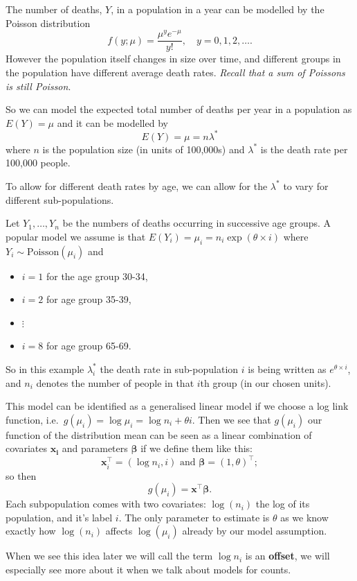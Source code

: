 \documentclass[
  a4paper,
  DIV=11,
  numbers=noendperiod]{scrreprt}
\providecommand{\tightlist}{%
  \setlength{\itemsep}{0pt}\setlength{\parskip}{0pt}}
\newcommand{\term}[1]{\textbf{#1}}
\newenvironment{fbxSimple}[3]{\begin{tcolorbox}[enhanced, breakable,%
attach boxed title to top*={xshift=1.4pt},
boxed title style={boxrule=0.0mm, fuzzy shadow={1pt}{-1pt}{0mm}{0.1mm}{gray}, arc=.3em, rounded corners=east, sharp corners=west}, colframe=#1-color2, colbacktitle=#1-color1, colback = white, coltitle=black,  titlerule=0mm, toprule=0pt, bottomrule=.7pt, leftrule=.3em, rightrule=.7pt, outer arc=.3em,  	left=.5em, right=.5em, bottomtitle=1mm, toptitle=1mm,title=\textbf{#2}\hspace{0.5em}{#3}]}
{\end{tcolorbox}}
\begin{document}
\label{a-model-for-mortality-rates}
\begin{fbxSimple}{Example}{Example 7: }{A model for mortality rates}
\label{a-model-for-mortality-rates}
The number of deaths, \(Y\), in a population in a year can be modelled
by the Poisson distribution \[
 f(y; \mu)=\frac{\mu^y e^{-\mu}}{y!}, \quad y=0,1,2,\dots.
 \] However the population itself changes in size over time, and
different groups in the population have different average death rates.
\emph{Recall that a sum of Poissons is still Poisson}.

So we can model the expected total number of deaths per year in a
population as \(E(Y)=\mu\) and it can be modelled by \[
E(Y)=\mu = n \lambda^*
\] where \(n\) is the population size (in units of 100,000s) and
\(\lambda^*\) is the death rate per 100,000 people.

To allow for different death rates by age, we can allow for the
\(\lambda^*\) to vary for different sub-populations.

Let \(Y_1,\dots, Y_n\) be the numbers of deaths occurring in successive
age groups. A popular model we assume is that
\(E(Y_i)=\mu_i = n_i \exp(\theta \times i)\) where
\(Y_i \sim \mathrm{Poisson}(\mu_i)\) and

\begin{itemize}
\tightlist
\item
  \(i=1\) for the age group 30-34,
\item
  \(i=2\) for age group 35-39,
\item
  \(\vdots\)
\item
  \(i=8\) for age group 65-69.
\end{itemize}

So in this example \(\lambda^*_i\) the death rate in sub-population
\(i\) is being written as \(e^{\theta \times i}\), and \(n_i\) denotes
the number of people in that \(i\)th group (in our chosen units).

This model can be identified as a generalised linear model if we choose
a log link function,
i.e.~\(g(\mu_i) = \log \mu_i = \log n_i +\theta i\). Then we see that
\(g(\mu_i)\) our function of the distribution mean can be seen as a
linear combination of covariates \(\boldsymbol{x_i}\) and parameters
\(\boldsymbol{\beta}\) if we define them like this: \[
\boldsymbol{x}_i^{\intercal}= (\log n_i, i) \text{ and } \boldsymbol{\beta}=(1, \theta)^{\intercal};
\] so then \[
g(\mu_i) = \boldsymbol{x}^{\intercal} \boldsymbol{\beta}.
\] Each subpopulation comes with two covariates: \(\log(n_i)\) the log
of its population, and it's label \(i\). The only parameter to estimate
is \(\theta\) as we know exactly how \(\log(n_i)\) affects
\(\log(\mu_i)\) already by our model assumption.

When we see this idea later we will call the term \(\log n_i\) is an
\term{offset}, we will especially see more about it when we talk about
models for counts.

\end{fbxSimple}
\end{document}
